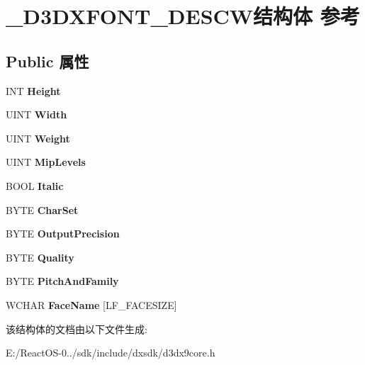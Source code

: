 \hypertarget{struct___d3_d_x_f_o_n_t___d_e_s_c_w}{}\section{\+\_\+\+D3\+D\+X\+F\+O\+N\+T\+\_\+\+D\+E\+S\+C\+W结构体 参考}
\label{struct___d3_d_x_f_o_n_t___d_e_s_c_w}
\subsection*{Public 属性}
\begin{DoxyCompactItemize}
\item 
\mbox{\label{struct___d3_d_x_f_o_n_t___d_e_s_c_w_a3a080dbecff26990eef07381de49ec75}} 
I\+NT {\bfseries Height}
\item 
\mbox{\label{struct___d3_d_x_f_o_n_t___d_e_s_c_w_a112ea871074cc5d2f71e5bc4ca9895ea}} 
U\+I\+NT {\bfseries Width}
\item 
\mbox{\label{struct___d3_d_x_f_o_n_t___d_e_s_c_w_a95c7c38f7ad306a85e0b3837aff348f3}} 
U\+I\+NT {\bfseries Weight}
\item 
\mbox{\label{struct___d3_d_x_f_o_n_t___d_e_s_c_w_a9ddce65d193913150e07199e00b646e4}} 
U\+I\+NT {\bfseries Mip\+Levels}
\item 
\mbox{\label{struct___d3_d_x_f_o_n_t___d_e_s_c_w_aa678f7afb79f520e5d8b918b71f83ced}} 
B\+O\+OL {\bfseries Italic}
\item 
\mbox{\label{struct___d3_d_x_f_o_n_t___d_e_s_c_w_a816bcd32e2e1286aff4c0082c2ac4c29}} 
B\+Y\+TE {\bfseries Char\+Set}
\item 
\mbox{\label{struct___d3_d_x_f_o_n_t___d_e_s_c_w_aac51f8af59b44cafd3a46ea73ca2055d}} 
B\+Y\+TE {\bfseries Output\+Precision}
\item 
\mbox{\label{struct___d3_d_x_f_o_n_t___d_e_s_c_w_a40b8f54f04687c086a82da5facd7e1b9}} 
B\+Y\+TE {\bfseries Quality}
\item 
\mbox{\label{struct___d3_d_x_f_o_n_t___d_e_s_c_w_aa0e5b151acbb7467b6e715514ca25271}} 
B\+Y\+TE {\bfseries Pitch\+And\+Family}
\item 
\mbox{\label{struct___d3_d_x_f_o_n_t___d_e_s_c_w_a89e81575259825b42404a38d0cce01d7}} 
W\+C\+H\+AR {\bfseries Face\+Name} \mbox{[}L\+F\+\_\+\+F\+A\+C\+E\+S\+I\+ZE\mbox{]}
\end{DoxyCompactItemize}


该结构体的文档由以下文件生成\+:\begin{DoxyCompactItemize}
\item 
E\+:/\+React\+O\+S-\/0../sdk/include/dxsdk/d3dx9core.\+h\end{DoxyCompactItemize}
